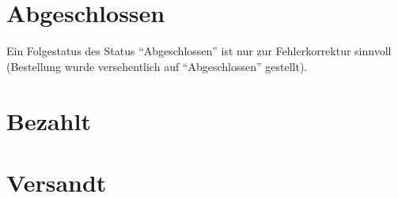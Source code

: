 \documentclass[a4paper]{scrreprt}
\begin{document}
        \section{Abgeschlossen}
        Ein Folgestatus des Status ``Abgeschlossen'' ist nur zur Fehlerkorrektur
        sinnvoll (Bestellung wurde versehentlich auf ``Abgeschlossen'' gestellt). \\

        \section{Bezahlt}

        \section{Versandt}
\end{document}
